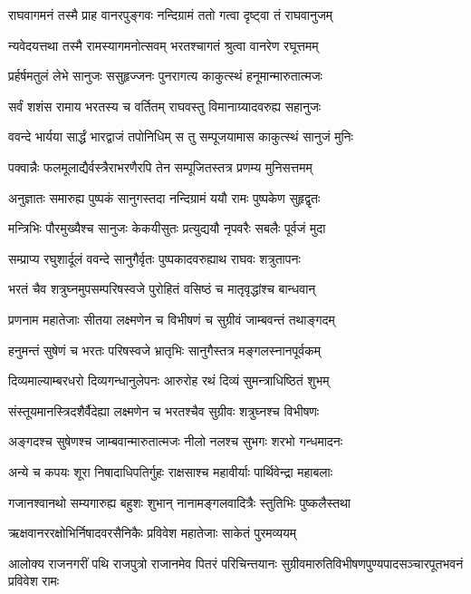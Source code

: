 \twolineshloka
{राघवागमनं तस्मै प्राह वानरपुङ्गवः}
{नन्दिग्रामं ततो गत्वा दृष्ट्वा तं राघवानुजम्}%

\twolineshloka
{न्यवेदयत्तथा तस्मै रामस्यागमनोत्सवम्}
{भरतश्चागतं श्रुत्वा वानरेण रघूत्तमम्}%

\twolineshloka
{प्रर्हर्षमतुलं लेभे सानुजः ससुहृज्जनः}
{पुनरागत्य काकुत्स्थं हनूमान्मारुतात्मजः}%

\twolineshloka
{सर्वं शशंस रामाय भरतस्य च वर्तितम्}
{राघवस्तु विमानाग्र्यादवरुह्य सहानुजः}%

\twolineshloka
{ववन्दे भार्यया सार्द्धं भारद्वाजं तपोनिधिम्}
{स तु सम्पूजयामास काकुत्स्थं सानुजं मुनिः}%

\twolineshloka
{पक्वान्नैः फलमूलाद्यैर्वस्त्रैराभरणैरपि}
{तेन सम्पूजितस्तत्र प्रणम्य मुनिसत्तमम्}%

\twolineshloka
{अनुज्ञातः समारुह्य पुष्पकं सानुगस्तदा}
{नन्दिग्रामं ययौ रामः पुष्पकेण सुहृद्वृतः}%

\twolineshloka
{मन्त्रिभिः पौरमुख्यैश्च सानुजः केकयीसुतः}
{प्रत्युद्ययौ नृपवरैः सबलैः पूर्वजं मुदा}%

\twolineshloka
{सम्प्राप्य रघुशार्दूलं ववन्दे सानुगैर्वृतः}
{पुष्पकादवरुह्याथ राघवः शत्रुतापनः}%

\twolineshloka
{भरतं चैव शत्रुघ्नमुपसम्परिषस्वजे}
{पुरोहितं वसिष्ठं च मातृवृद्धांश्च बान्धवान्}%

\twolineshloka
{प्रणनाम महातेजाः सीतया लक्ष्मणेन च}
{विभीषणं च सुग्रीवं जाम्बवन्तं तथाङ्गदम्}%

\twolineshloka
{हनुमन्तं सुषेणं च भरतः परिषस्वजे}
{भ्रातृभिः सानुगैस्तत्र मङ्गलस्नानपूर्वकम्}%

\twolineshloka
{दिव्यमाल्याम्बरधरो दिव्यगन्धानुलेपनः}
{आरुरोह रथं दिव्यं सुमन्त्राधिष्ठितं शुभम्}%

\twolineshloka
{संस्तूयमानस्त्रिदशैर्वैदेह्या लक्ष्मणेन च}
{भरतश्चैव सुग्रीवः शत्रुघ्नश्च विभीषणः}%

\twolineshloka
{अङ्गदश्च सुषेणश्च जाम्बवान्मारुतात्मजः}
{नीलो नलश्च सुभगः शरभो गन्धमादनः}%

\twolineshloka
{अन्ये च कपयः शूरा निषादाधिपतिर्गुहः}
{राक्षसाश्च महावीर्याः पार्थिवेन्द्रा महाबलाः}%

\twolineshloka
{गजानश्वानथो सम्यगारुह्य बहुशः शुभान्}
{नानामङ्गलवादित्रैः स्तुतिभिः पुष्कलैस्तथा}%

\twolineshloka
{ऋक्षवानररक्षोभिर्निषादवरसैनिकैः}
{प्रविवेश महातेजाः साकेतं पुरमव्ययम्}%

\twolineshloka
{आलोक्य राजनगरीं पथि राजपुत्रो राजानमेव पितरं परिचिन्तयानः}
{सुग्रीवमारुतिविभीषणपुण्यपादसञ्चारपूतभवनं प्रविवेश रामः}%

